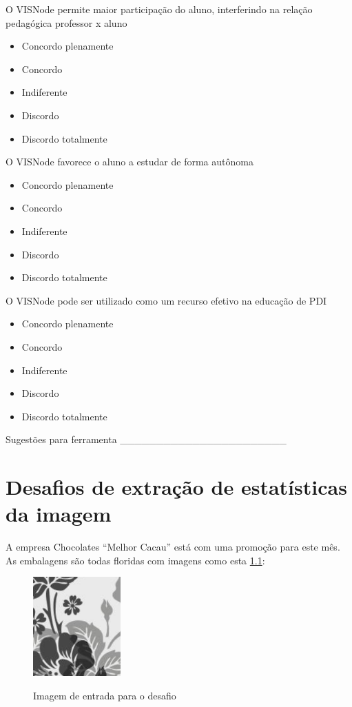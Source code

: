 \documentclass[
	12pt,				%
	oneside,			%
	a4paper,			%
	english,			%
	french,				%
	spanish,			%
	brazil,				%
	]{abntex2}
\makeatletter
\newcommand*{\radiobutton}{%
  \@ifstar{\@radiobutton0}{\@radiobutton1}%
}
\newcommand*{\@radiobutton}[1]{%
  \begin{tikzpicture}
    \pgfmathsetlengthmacro\radius{height("X")/2}
    \draw[radius=\radius] circle;
    \ifcase#1 \fill[radius=.6*\radius] circle;\fi
  \end{tikzpicture}%
}
\makeatother
\begin{document}
\begin{apendicesenv}
\noindent O VISNode permite maior participação do aluno, interferindo na relação pedagógica professor x aluno

\begin{itemize}
\item[\radiobutton] Concordo plenamente
\item[\radiobutton] Concordo
\item[\radiobutton] Indiferente
\item[\radiobutton] Discordo
\item[\radiobutton] Discordo totalmente
\end{itemize}

\noindent O VISNode favorece o aluno a estudar de forma autônoma

\begin{itemize}
\item[\radiobutton] Concordo plenamente
\item[\radiobutton] Concordo
\item[\radiobutton] Indiferente
\item[\radiobutton] Discordo
\item[\radiobutton] Discordo totalmente
\end{itemize}

\noindent O VISNode pode ser utilizado como um recurso efetivo na educação de PDI

\begin{itemize}
\item[\radiobutton] Concordo plenamente
\item[\radiobutton] Concordo
\item[\radiobutton] Indiferente
\item[\radiobutton] Discordo
\item[\radiobutton] Discordo totalmente
\end{itemize}

\noindent Sugestões para ferramenta \_\_\_\_\_\_\_\_\_\_\_\_\_\_\_\_\_\_\_\_\_\_\_

\chapter{Desafios de extração de estatísticas da imagem}
\label{desafio:estatistica}

A empresa Chocolates “Melhor Cacau” está com uma promoção para este mês. As embalagens são todas floridas com imagens como esta \ref{fig:desafioEstatistica}:

\begin{figure}[ht]
\centering
\caption{Imagem de entrada para o desafio}
\includegraphics[width=0.3\textwidth]{imagens/Desafio_estatisticas.png}
\label{fig:desafioEstatistica}
\sourceAuthor
\end{figure}


\end{apendicesenv}
\end{document}
